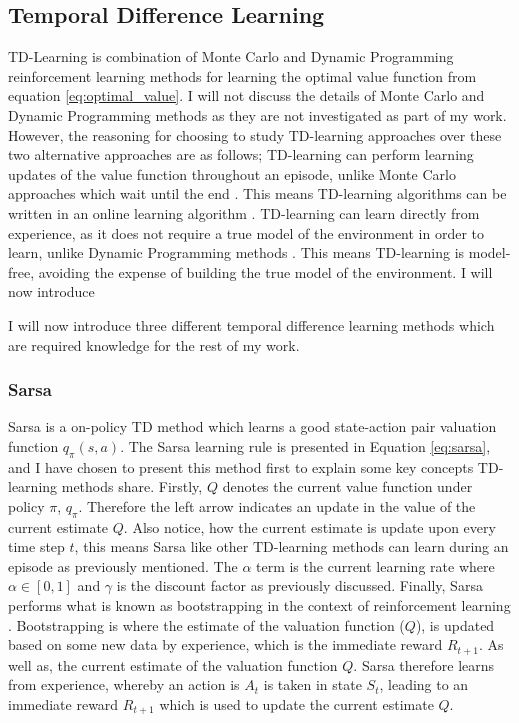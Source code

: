 \documentclass[ %
                    author={Callum Pearce},
                supervisor={Dr. Neill Campbell},
                    degree={MEng},
                     title={How effective are Temporal difference learning methods for reducing the number of zero contribution light paths while still accurately approximating Global Illumination in Path tracing?},
                  subtitle={},
                      type={research},
                      year={2019} ]{dissertation}
\begin{document}
\subsection{Temporal Difference Learning}

TD-Learning is combination of Monte Carlo and Dynamic Programming reinforcement learning methods for learning the optimal value function from equation \ref{eq:optimal_value}. I will not discuss the details of Monte Carlo and Dynamic Programming methods as they are not investigated as part of my work. However, the reasoning for choosing to study  TD-learning approaches over these two alternative approaches are as follows; TD-learning can perform learning updates of the value function throughout an episode, unlike Monte Carlo approaches which wait until the end \cite{model_free_prediction}. This means TD-learning algorithms can be written in an online learning algorithm \cite{sutton2011reinforcement}. TD-learning can learn directly from experience, as it does not require a true model of the environment in order to learn, unlike Dynamic Programming methods \cite{mdp_dynamic_prog}. This means TD-learning is model-free, avoiding the expense of building the true model of the environment. I will now introduce

I will now introduce three different temporal difference learning methods which are required knowledge for the rest of my work.

\subsubsection*{Sarsa}

Sarsa is a on-policy TD method which learns a good state-action pair valuation function $q_\pi(s,a)$. The Sarsa learning rule is presented in Equation \ref{eq:sarsa}, and I have chosen to present this method first to explain some key concepts TD-learning methods share. Firstly, $Q$ denotes the current value function under policy $\pi$, $q_\pi$. Therefore the left arrow indicates an update in the value of the current estimate $Q$. Also notice, how the current estimate is update upon every time step $t$, this means Sarsa like other TD-learning methods can learn during an episode as previously mentioned. The $\alpha$ term is the current learning rate where $\alpha \in [0,1]$ and $\gamma$ is the discount factor as previously discussed. Finally, Sarsa performs what is known as bootstrapping in the context of reinforcement learning \cite{sutton2011reinforcement}. Bootstrapping is where the  estimate of the valuation function ($Q$), is updated based on some new data by experience, which is the immediate reward $R_{t+1}$. As well as, the current estimate of the valuation function $Q$. Sarsa therefore learns from experience, whereby an action is $A_t$ is taken in state $S_{t}$, leading to an immediate reward $R_{t+1}$ which is used to update the current estimate $Q$.
\end{document}
